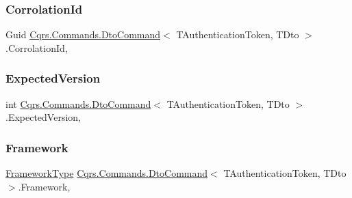 \subsubsection{\texorpdfstring{Corrolation\+Id}{CorrolationId}}
{\footnotesize\ttfamily Guid \hyperlink{classCqrs_1_1Commands_1_1DtoCommand}{Cqrs.\+Commands.\+Dto\+Command}$<$ T\+Authentication\+Token, T\+Dto $>$.Corrolation\+Id\hspace{0.3cm}{\ttfamily [get]}, {\ttfamily [set]}}

\mbox{\label{classCqrs_1_1Commands_1_1DtoCommand_a9429ca1b2c6576c36d46912a18e5dc18_a9429ca1b2c6576c36d46912a18e5dc18}} 
\subsubsection{\texorpdfstring{Expected\+Version}{ExpectedVersion}}
{\footnotesize\ttfamily int \hyperlink{classCqrs_1_1Commands_1_1DtoCommand}{Cqrs.\+Commands.\+Dto\+Command}$<$ T\+Authentication\+Token, T\+Dto $>$.Expected\+Version\hspace{0.3cm}{\ttfamily [get]}, {\ttfamily [set]}}

\mbox{\label{classCqrs_1_1Commands_1_1DtoCommand_aef8db1c8e62c27c09abd1590f05bfba1_aef8db1c8e62c27c09abd1590f05bfba1}} 
\subsubsection{\texorpdfstring{Framework}{Framework}}
{\footnotesize\ttfamily \hyperlink{namespaceCqrs_1_1Messages_af06a7e6cd2609043d0f2f5f3419f81e3_af06a7e6cd2609043d0f2f5f3419f81e3}{Framework\+Type} \hyperlink{classCqrs_1_1Commands_1_1DtoCommand}{Cqrs.\+Commands.\+Dto\+Command}$<$ T\+Authentication\+Token, T\+Dto $>$.Framework\hspace{0.3cm}{\ttfamily [get]}, {\ttfamily [set]}}

